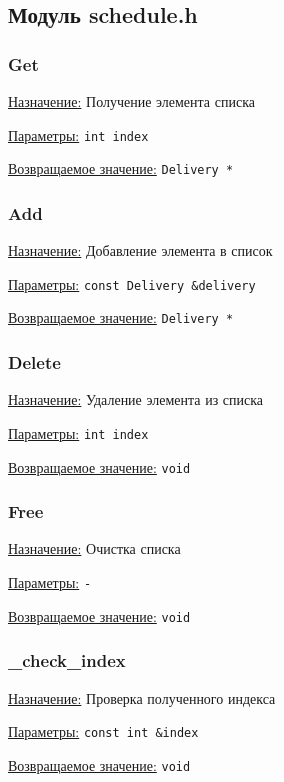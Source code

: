 \subsection{Модуль schedule.h}


\subsubsection{Get}

\underline{Назначение:} Получение элемента списка

\underline{Параметры:} \verb|int index|

\underline{Возвращаемое значение:} \verb|Delivery *|


\subsubsection{Add}

\underline{Назначение:} Добавление элемента в список

\underline{Параметры:} \verb|const Delivery &delivery|

\underline{Возвращаемое значение:} \verb|Delivery *|


\subsubsection{Delete}

\underline{Назначение:} Удаление элемента из списка

\underline{Параметры:} \verb|int index|

\underline{Возвращаемое значение:} \verb|void|


\subsubsection{Free}

\underline{Назначение:} Очистка списка

\underline{Параметры:} \verb|-|

\underline{Возвращаемое значение:} \verb|void|


\subsubsection{\_check\_index}

\underline{Назначение:} Проверка полученного индекса

\underline{Параметры:} \verb|const int &index|

\underline{Возвращаемое значение:} \verb|void|

